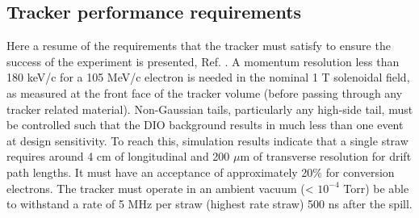 \subsection{Tracker performance requirements}
Here a resume of the requirements that the tracker must satisfy to ensure the 
success of the experiment is presented, Ref. \cite{trkreq}.
A momentum resolution less than 180 keV/c for a 105 MeV/c electron is needed in the nominal
1 T solenoidal field, as measured at the front face of the tracker volume (before
passing through any tracker related material). Non-Gaussian tails, particularly any
high-side tail, must be controlled such that the DIO background results in much less
than one event at design sensitivity. To reach this, simulation results indicate that 
a single straw requires around 4 cm of longitudinal and 200 $\mu$m of transverse 
resolution for drift path lengths. 
It must have an acceptance of approximately 20\% for conversion electrons.
The tracker must operate in an ambient vacuum (< $10^{-4}$ Torr)  be able to withstand a rate of 5 MHz per straw (highest rate straw) 
500 ns after the spill. 

